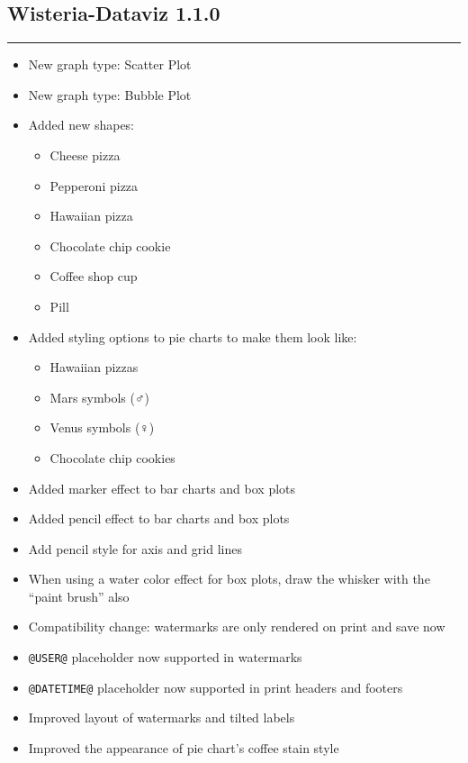 \documentclass[
]{scrartcl}
\providecommand{\tightlist}{%
  \setlength{\itemsep}{0pt}\setlength{\parskip}{0pt}}
\begin{document}
\subsection*{Wisteria-Dataviz 1.1.0}\label{section-4}

\begin{center}\rule{0.5\linewidth}{0.5pt}\end{center}

\begin{itemize}
\tightlist
\item
  New graph type: Scatter Plot
\item
  New graph type: Bubble Plot
\item
  Added new shapes:

  \begin{itemize}
  \tightlist
  \item
    Cheese pizza
  \item
    Pepperoni pizza
  \item
    Hawaiian pizza
  \item
    Chocolate chip cookie
  \item
    Coffee shop cup
  \item
    Pill
  \end{itemize}
\item
  Added styling options to pie charts to make them look like:

  \begin{itemize}
  \tightlist
  \item
    Hawaiian pizzas
  \item
    Mars symbols (♂)
  \item
    Venus symbols (♀)
  \item
    Chocolate chip cookies
  \end{itemize}
\item
  Added marker effect to bar charts and box plots
\item
  Added pencil effect to bar charts and box plots
\item
  Add pencil style for axis and grid lines
\item
  When using a water color effect for box plots, draw the whisker with
  the ``paint brush'' also
\item
  Compatibility change: watermarks are only rendered on print and save
  now
\item
  \texttt{@USER@} placeholder now supported in watermarks
\item
  \texttt{@DATETIME@} placeholder now supported in print headers and
  footers
\item
  Improved layout of watermarks and tilted labels
\item
  Improved the appearance of pie chart's coffee stain style
\end{itemize}
\end{document}
